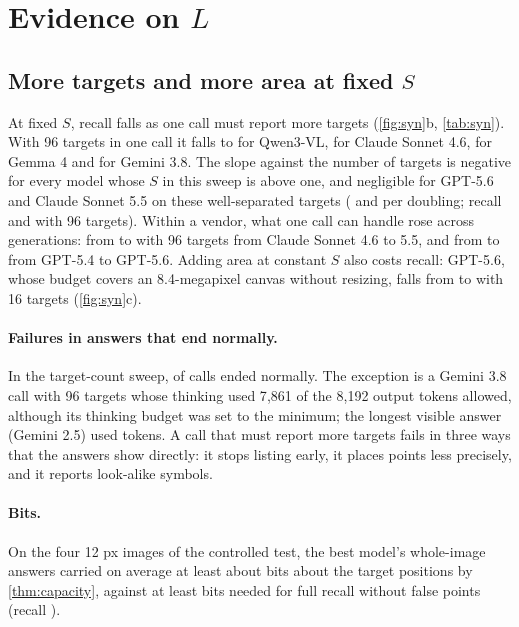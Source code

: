 \section{Evidence on $L$}
\label{sec:L-evidence}

\subsection{More targets and more area at fixed $S$}
\label{sec:L-sweeps}

At fixed $S$, recall falls as one call must report more targets (\cref{fig:syn}b, \cref{tab:syn}). With 96 targets in one call it falls to \XcapNlastqwenThreevl{} for Qwen3-VL, \XcapNlastsonnetFourSix{} for Claude Sonnet 4.6, \XcapNlastgemmaFour{} for Gemma 4 and \XcapNlastgemThreeEight{} for Gemini 3.8. The slope against the number of targets is negative for every model whose $S$ in this sweep is above one, and negligible for GPT-5.6 and Claude Sonnet 5.5 on these well-separated targets (\XcapSlopegptFiveSix{} and \XcapSlopesonnetFiveFive{} per doubling; recall \XcapNlastgptFiveSix{} and \XcapNlastsonnetFiveFive{} with 96 targets). Within a vendor, what one call can handle rose across generations: from \XcapNlastsonnetFourSix{} to \XcapNlastsonnetFiveFive{} with 96 targets from Claude Sonnet 4.6 to 5.5, and from \XcapNlastgptFiveFour{} to \XcapNlastgptFiveSix{} from GPT-5.4 to GPT-5.6. Adding area at constant $S$ also costs recall: GPT-5.6, whose budget covers an 8.4-megapixel canvas without resizing, falls from \XareaFirstgptFiveSix{} to \XareaLastgptFiveSix{} with 16 targets (\cref{fig:syn}c).

\paragraph{Failures in answers that end normally.} In the target-count sweep, \CcapNormal{} of \CcapCalls{} calls ended normally. The exception is a Gemini 3.8 call with 96 targets whose thinking used 7{,}861 of the 8{,}192 output tokens allowed, although its thinking budget was set to the minimum; the longest visible answer (Gemini 2.5) used \CcapMaxOut{} tokens. A call that must report more targets fails in three ways that the answers show directly: it stops listing early, it places points less precisely, and it reports look-alike symbols.

\paragraph{Bits.} On the four 12 px images of the controlled test, the best model's whole-image answers carried on average at least about \XcapBestBits{} bits about the target positions by \cref{thm:capacity}, against at least \XcapBestFull{} bits needed for full recall without false points (recall \XcapBestRecall).

